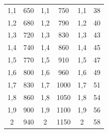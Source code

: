 \begin{table}[H]
\begin{tabular}{S[table-format=1.2] S[table-format=3] S[table-format=1.2] S[table-format=4]S[table-format=1.2]S[table-format=2]}
      1,1 & 650 & 1,1 & 750 & 1,1 & 38 \\
      1,2 & 680 & 1,2 & 790 & 1,2 & 40 \\
      1,3 & 720 & 1,3 & 830 & 1,3 & 43 \\
      1,4 & 740 & 1,4 & 860 & 1,4 & 45 \\
      1,5 & 770 & 1,5 & 910 & 1,5 & 47 \\
      1,6 & 800 & 1,6 & 960 & 1,6 & 49 \\
      1,7 & 830 & 1,7 & 1000 & 1,7 & 51 \\
      1,8 & 860 & 1,8 & 1050 & 1,8 & 54 \\
      1,9 & 900 & 1,9 & 1100 & 1,9 & 56 \\
      2 & 940 & 2 & 1150 & 2 & 58 \\
      \bottomrule
  \end{tabular}
\end{table}

